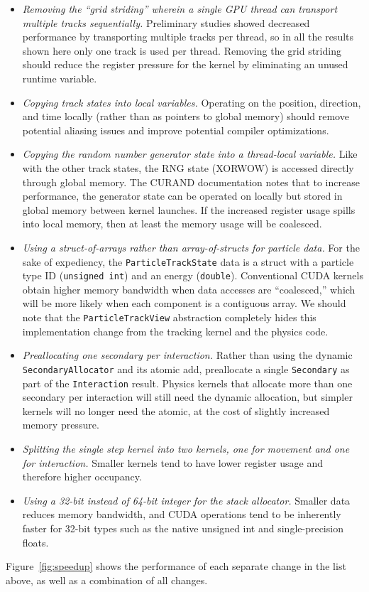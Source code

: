\documentclass{webofc}
\begin{document}
\begin{itemize}
  \item \emph{Removing the ``grid striding'' wherein a single GPU thread can
    transport multiple tracks sequentially.} Preliminary studies showed
    decreased performance by transporting multiple tracks per thread, so in all
    the results shown here only one track is used per thread. Removing the grid
    striding should reduce the register pressure for the kernel by eliminating
    an unused runtime variable.
  \item \emph{Copying track states into local variables.} Operating on the
    position, direction, and time locally (rather than as pointers to global
    memory) should remove potential aliasing issues and improve potential
    compiler optimizations.
  \item \emph{Copying the random number generator state into a thread-local
    variable.}
    Like with the other track states, the RNG state (XORWOW) is accessed
    directly through global memory. The CURAND documentation notes
    that to increase performance, the generator state can be operated on locally
    but stored in global memory between kernel launches. If the increased
    register usage spills into local memory, then at least the memory usage will
    be coalesced.
  \item \emph{Using a struct-of-arrays rather than array-of-structs for particle
    data.} For the sake of expediency, the \texttt{ParticleTrackState} data is a
    struct with a particle type ID (\texttt{unsigned int}) and an energy
    (\texttt{double}). Conventional CUDA kernels obtain higher memory
    bandwidth when data accesses are ``coalesced,'' which will be more likely
    when each component is a contiguous array. We should note that the
    \texttt{ParticleTrackView} abstraction completely hides this implementation
    change from the tracking kernel and the physics code.
  \item \emph{Preallocating one secondary per interaction.} Rather than using
    the dynamic \texttt{SecondaryAllocator} and its atomic add, preallocate a
    single \texttt{Secondary} as part of the \texttt{Interaction} result.
    Physics kernels that allocate more than one secondary per interaction will
    still need the dynamic allocation, but simpler kernels will no longer need
    the atomic, at the cost of slightly increased memory pressure.
  \item \emph{Splitting the single step kernel into two kernels, one for movement
    and one for interaction.} Smaller kernels tend to have lower register usage
    and therefore higher occupancy.
  \item \emph{Using a 32-bit instead of 64-bit integer for the stack allocator.}
    Smaller data reduces memory bandwidth, and CUDA operations tend to be
    inherently faster for 32-bit types such as the native unsigned int and
    single-precision floats.
\end{itemize}
Figure~\ref{fig:speedup} shows the performance of each separate change in the
list above, as well as a combination of all changes.
\end{document}
